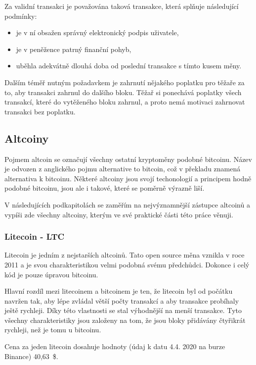 \documentclass[thesis=B,czech]{FITthesis}[2019/03/21]
\begin{document}
Za validní transakci je považována taková transakce, která splňuje následující podmínky:
\begin{itemize}
    \item je v ní obsažen správný elektronický podpis uživatele,
    \item je v peněžence patrný finanční pohyb,
    \item uběhla adekvátně dlouhá doba od poslední transakce s tímto kusem měny. \cite{Finex_blockchain}
\end{itemize}
Dalším téměř nutným požadavkem je zahrnutí nějakého poplatku pro těžaře za to, aby transakci zahrnul do dalšího bloku. Těžař si ponechává poplatky všech transakcí, které do vytěženého bloku zahrnul, a proto nemá motivaci zahrnovat transakci bez poplatku. \cite{Finex_blockchain}


\subsection{Altcoiny}
Pojmem altcoin se označují všechny ostatní kryptoměny podobné bitcoinu. Název je odvozen z anglického pojmu alternative to bitcoin, což v překladu znamená alternativa k bitcoinu. Některé altcoiny jsou svojí techonologií a principem hodně podobné bitcoinu, jsou ale i takové, které se poměrně výrazně liší. \cite{altcoin}

V následujících podkapitolách se zaměřím na nejvýznamnější zástupce altcoinů a vypíši zde všechny altcoiny, kterým ve své praktické části této práce věnuji.

\subsubsection{Litecoin - LTC}
Litecoin je jedním z nejstarších altcoinů. Tato open source měna vznikla v roce 2011 a je svou charakteristikou velmi podobná svému předchůdci. \cite{litecoin} Dokonce i celý kód je pouze úpravou bitcoinu. \cite{alza_monero}

Hlavní rozdíl mezi litecoinem a bitcoinem je ten, že litecoin byl od počátku navržen tak, aby lépe zvládal větší počty transakcí a aby transakce probíhaly ještě rychleji. Díky této vlastnosti se stal výhodnější na menší transakce. Tyto všechny charakteristiky jsou založeny na tom, že jsou bloky přidávány čtyřikrát rychleji, než je tomu u bitcoinu. \cite{litecoin}

Cena za jeden litecoin dosahuje hodnoty (údaj k datu 4.4. 2020 na burze Binance) 40,63~\$. \cite{binance_markets}
\end{document}

